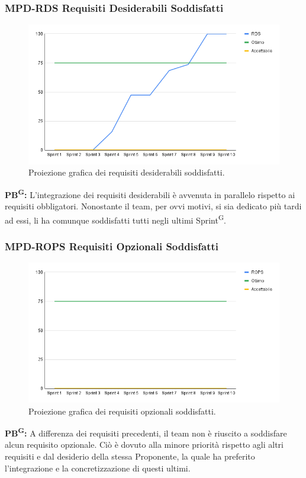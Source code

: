 \documentclass[8pt]{article}
\newcommand{\glossterm}[1]{#1\textsuperscript{G}} %
\begin{document}
\subsubsection{MPD-RDS Requisiti Desiderabili Soddisfatti}
\begin{figure}[h!]
    \centering
    \includegraphics[width=1\textwidth]{images_pdq/RDS.png}
    \caption{Proiezione grafica dei requisiti desiderabili soddisfatti.}
    \label{fig:Proiezione grafica dei desiderabili obbligatori soddisfatti}
\end{figure}
\textbf{\glossterm{PB}:} L'integrazione dei requisiti desiderabili è avvenuta in parallelo rispetto ai requisiti obbligatori. Nonostante il team, per ovvi motivi, si sia dedicato più tardi ad essi, li ha comunque soddisfatti tutti negli ultimi \glossterm{Sprint}.
\clearpage
\subsubsection{MPD-ROPS Requisiti Opzionali Soddisfatti}
\begin{figure}[h!]
    \centering
    \includegraphics[width=1\textwidth]{images_pdq/ROPS.png}
    \caption{Proiezione grafica dei requisiti opzionali soddisfatti.}
    \label{fig:Proiezione grafica dei requisiti opzionali soddisfatti}
\end{figure}
\textbf{\glossterm{PB}:} A differenza dei requisiti precedenti, il team non è riuscito a soddisfare alcun requisito opzionale. Ciò è dovuto alla minore priorità rispetto agli altri requisiti e dal desiderio della stessa Proponente, la quale ha preferito l'integrazione e la concretizzazione di questi ultimi.
\clearpage
\end{document}

